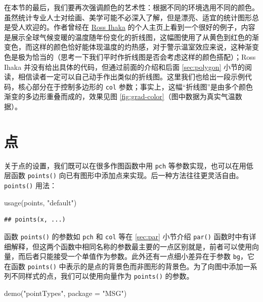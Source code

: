 \documentclass[
  b5paper,
  UTF8,twoside]{book}
\newenvironment{Shaded}{\begin{snugshade}}{\end{snugshade}}
\newcommand{\AttributeTok}[1]{\textcolor[rgb]{0.77,0.63,0.00}{#1}}
\newcommand{\FunctionTok}[1]{\textcolor[rgb]{0.00,0.00,0.00}{#1}}
\newcommand{\NormalTok}[1]{#1}
\newcommand{\StringTok}[1]{\textcolor[rgb]{0.31,0.60,0.02}{#1}}
\begin{document}
在本节的最后，我们要再次强调颜色的艺术性：根据不同的环境选用不同的颜色。虽然统计专业人士对绘画、美学可能不必深入了解，但是漂亮、适宜的统计图形总是受人欢迎的。作者曾经在 \href{https://www.stat.auckland.ac.nz/~ihaka/}{Ross Ihaka} 的个人主页上看到一个很好的例子，内容是展示全球气候变暖的温度随年份变化的折线图，这幅图使用了从黄色到红色的渐变色，而这样的颜色恰好能体现温度的灼热感，对于警示温室效应来说，这种渐变色是极为恰当的（思考一下我们平时作折线图是否会考虑这样的颜色搭配）；Ross Ihaka 并没有给出具体的代码，但通过前面的介绍和后面 \ref{sec:polygon} 小节的阅读，相信读者一定可以自己动手作出类似的折线图。这里我们也给出一段示例代码，核心部分在于控制多边形的 \texttt{col} 参数；事实上，这幅``折线图''是由多个颜色渐变的多边形重叠而成的，效果见图 \ref{fig:grad-color}（图中数据为真实气温数据）。

\hypertarget{sec:points}{%
\section{点}\label{sec:points}}

关于点的设置，我们既可以在很多作图函数中用 \texttt{pch} 等参数实现，也可以在用低层函数 \texttt{points()} 向已有图形中添加点来实现。后一种方法往往更灵活自由。\texttt{points()} 用法：

\begin{Shaded}
\begin{Highlighting}[]
\FunctionTok{usage}\NormalTok{(points, }\StringTok{"default"}\NormalTok{)}
\end{Highlighting}
\end{Shaded}

\begin{verbatim}
## points(x, ...)
\end{verbatim}

函数 \texttt{points()} 的参数如 \texttt{pch} 和 \texttt{col} 等在 \ref{sec:par} 小节介绍 \texttt{par()} 函数时中有详细解释，但这两个函数中相同名称的参数最主要的一点区别就是，前者可以使用向量，而后者只能接受一个单值作为参数。此外还有一点细小差异在于参数 \texttt{bg}，它在函数 \texttt{points()} 中表示的是点的背景色而非图形的背景色。为了向图中添加一系列不同样式的点，我们可以使用向量作为 \texttt{points()} 的参数。

\begin{Shaded}
\begin{Highlighting}[]
\FunctionTok{demo}\NormalTok{(}\StringTok{"pointTypes"}\NormalTok{, }\AttributeTok{package =} \StringTok{"MSG"}\NormalTok{)}
\end{Highlighting}
\end{Shaded}
\end{document}

